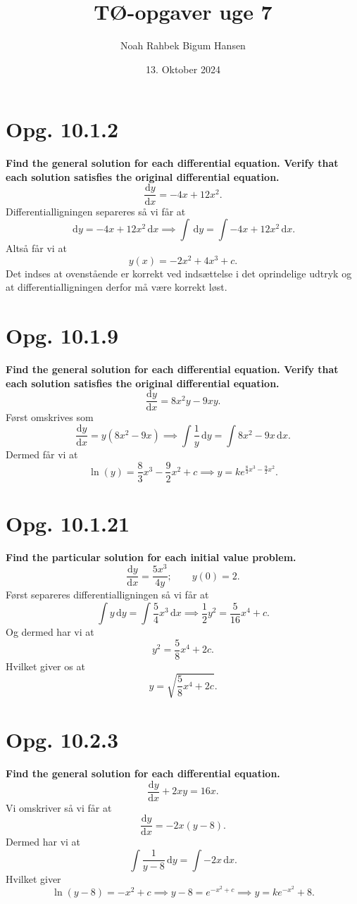 \documentclass[12pt]{article}
\title{TØ-opgaver uge 7}
\author{Noah Rahbek Bigum Hansen}
\date{13. Oktober 2024}
\begin{document}
\maketitle

\section*{Opg. 10.1.2}
\textbf{Find the general solution for each differential equation. Verify that each solution satisfies the original differential equation.}
\[
\frac{\mathrm{d}y}{\mathrm{d}x} = -4x + 12x^2
.\]
\bigbreak
Differentialligningen separeres så vi får at
\[
\, \mathrm{d}y = -4x + 12x^2 \, \mathrm{d}x \implies \int \, \mathrm{d}y = \int -4x + 12x^2 \, \mathrm{d}x
.\] 
Altså får vi at
\[
y(x) = -2x^2 + 4x^3 + c
.\]
Det indses at ovenstående er korrekt ved indsættelse i det oprindelige udtryk og at differentialligningen derfor må være korrekt løst.

\section*{Opg. 10.1.9}
\textbf{Find the general solution for each differential equation. Verify that each solution satisfies the original differential equation.}
\[ 
\frac{\mathrm{d}y}{\mathrm{d}x} = 8x^2y-9xy
.\]
\bigbreak
Først omskrives som
\[
\frac{\mathrm{d}y}{\mathrm{d}x} = y\left( 8x^2-9x \right) \implies \int \frac{1}{y} \, \mathrm{d}y = \int 8x^2-9x \, \mathrm{d}x
.\]
Dermed får vi at
\[
\ln(y) = \frac{8}{3}x^3 - \frac{9}{2}x^2 + c \implies y = ke^{\frac{8}{3}x^3 - \frac{9}{2}x^2}
.\] 

\section*{Opg. 10.1.21}
\textbf{Find the particular solution for each initial value problem.}
\[
\frac{\mathrm{d}y}{\mathrm{d}x} = \frac{5x^3}{4y}; \qquad y(0) = 2
.\]
\bigbreak
Først separeres differentialligningen så vi får at
\[
\int y \, \mathrm{d}y = \int \frac{5}{4}x^3 \, \mathrm{d}x \implies \frac{1}{2}y^2 = \frac{5}{16}x^4 + c
.\] 
Og dermed har vi at
\[
y^2 = \frac{5}{8}x^4 + 2c
.\]
Hvilket giver os at
\[
y = \sqrt{\frac{5}{8}x^4+2c} 
.\] 


\section*{Opg. 10.2.3}
\textbf{Find the general solution for each differential equation.}
\[
\frac{\mathrm{d}y}{\mathrm{d}x} + 2xy = 16x
.\] 
\bigbreak
Vi omskriver så vi får at
\[
\frac{\mathrm{d}y}{\mathrm{d}x} = -2x(y-8)
.\] 
Dermed har vi at
\[
\int \frac{1}{y-8} \, \mathrm{d}y = \int -2x \, \mathrm{d}x
.\]
Hvilket giver
\[
\ln(y-8) = -x^2 + c \implies y-8 = e^{-x^2+c} \implies y = ke^{-x^2}+8
.\] 
\end{document}
